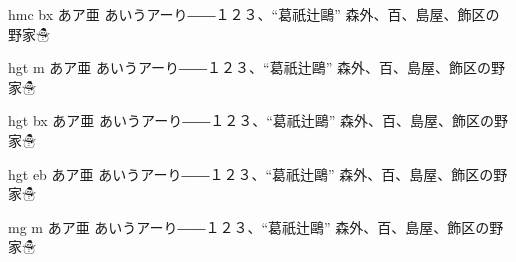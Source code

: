 \documentclass[dvipdfmx,uplatex,9pt]{jsarticle}
\begin{document}
\selectfont hmc bx あア亜
あいうアーり――１２３、“葛祇辻鷗” 森外、百、島屋、飾区の野家☃


\selectfont hgt m あア亜
あいうアーり――１２３、“葛祇辻鷗” 森外、百、島屋、飾区の野家☃

\selectfont hgt bx あア亜
あいうアーり――１２３、“葛祇辻鷗” 森外、百、島屋、飾区の野家☃

\selectfont hgt eb あア亜
あいうアーり――１２３、“葛祇辻鷗” 森外、百、島屋、飾区の野家☃


\selectfont mg m あア亜
あいうアーり――１２３、“葛祇辻鷗” 森外、百、島屋、飾区の野家☃
\end{document}
